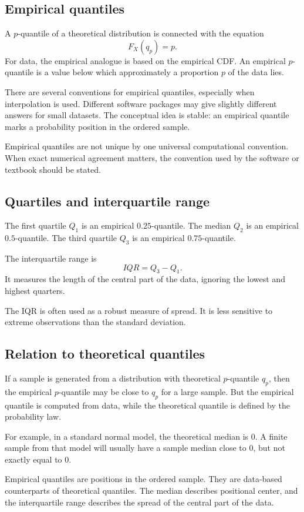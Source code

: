 \subsection*{Empirical quantiles}

A \(p\)-quantile of a theoretical distribution is connected with the equation
\[
F_X(q_p)=p.
\]
For data, the empirical analogue is based on the empirical CDF. An empirical
\(p\)-quantile is a value below which approximately a proportion \(p\) of the data
lies.

There are several conventions for empirical quantiles, especially when
interpolation is used. Different software packages may give slightly different
answers for small datasets. The conceptual idea is stable: an empirical quantile
marks a probability position in the ordered sample.

\begin{remarkbox}
Empirical quantiles are not unique by one universal computational convention.
When exact numerical agreement matters, the convention used by the software or
textbook should be stated.
\end{remarkbox}

\subsection*{Quartiles and interquartile range}

The first quartile \(Q_1\) is an empirical \(0.25\)-quantile. The median \(Q_2\)
is an empirical \(0.5\)-quantile. The third quartile \(Q_3\) is an empirical
\(0.75\)-quantile.

The interquartile range is
\[
IQR=Q_3-Q_1.
\]
It measures the length of the central part of the data, ignoring the lowest and
highest quarters.

The IQR is often used as a robust measure of spread. It is less sensitive to
extreme observations than the standard deviation.

\subsection*{Relation to theoretical quantiles}

If a sample is generated from a distribution with theoretical \(p\)-quantile
\(q_p\), then the empirical \(p\)-quantile may be close to \(q_p\) for a large
sample. But the empirical quantile is computed from data, while the theoretical
quantile is defined by the probability law.

For example, in a standard normal model, the theoretical median is \(0\). A
finite sample from that model will usually have a sample median close to \(0\),
but not exactly equal to \(0\).

\begin{summarybox}
Empirical quantiles are positions in the ordered sample. They are data-based
counterparts of theoretical quantiles. The median describes positional center,
and the interquartile range describes the spread of the central part of the data.
\end{summarybox}
